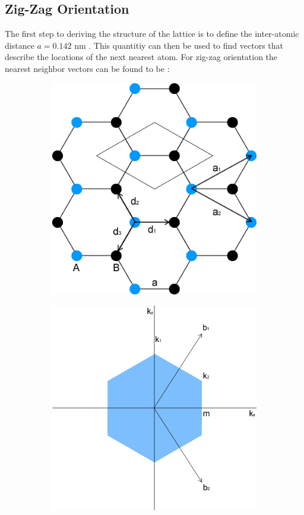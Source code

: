 		\subsection{Zig-Zag Orientation}
		\label{Introduction - Zig-Zag Orientation}
			The first step to deriving the structure of the lattice is to define the inter-atomic distance $a=0.142$ nm \cite{b8}. This quantitiy can then be used to find vectors that describe the locations of the next nearest atom. For zig-zag orientation the nearest neighbor vectors can be found to be \cite{b1}:
			\begin{figure}[h]
				 \begin{subfigure}[h]{0.47\textwidth}
					\centerline{\includegraphics[scale=0.5]{images/strucure-zig-flat}}
					\caption{}
				\end{subfigure}
				\hspace{1cm}
				\begin{subfigure}[h]{0.47\textwidth}
					\centerline{\includegraphics[scale=0.42]{images/strucure-bz-zig-flat}}

\end{subfigure}
\end{figure}
